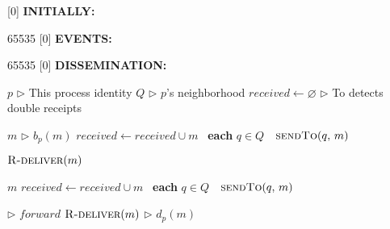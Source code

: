 
[0] {\textbf{INITIALLY:}}

{65535}{}
[0] {\textbf{EVENTS:}}

{65535}{}
[0] {\textbf{DISSEMINATION:}}


\newcommand{\comment}[1]{$\rhd$ #1}
\newcommand{\LINEIFTHEN}[2]{%
  \algorithmicif\ {#1}\ \algorithmicthen\ {#2} %
}
\newcommand{\LINEIFTHENELSE}[3]{%
  \algorithmicif\ {#1}\ \algorithmicthen\ {#2} \algorithmicelse\ {#3}%
}

\newcommand{\LINEFOR}[2]{%
  \algorithmicfor\ {#1}\ \algorithmicdo\ {#2} %
}

\begin{algorithmic}[1]
  \small

  \initially
  \State $p$ \hfill \comment{This process identity}
  \State $Q$ \hfill \comment{$p$'s neighborhood}
  \State $received \leftarrow \varnothing$ \hfill
  \comment{To detects double receipts} 
  \endInitially
  
  \dissemination

   {$m$} \hfill \comment{$b_p(m)$}
  \State $received \leftarrow received \cup m$
  \State \LINEFOR{\textbf{each} $q \in Q$} 
  {$\textsc{sendTo}(q,\, m)$}
  \State $\textsc{R-deliver}(m)$ 
  \EndFunction
  
  \Statex


  
   {$m$}  
  \State $received \leftarrow received \cup m$
  \State \LINEFOR{\textbf{each} $q \in Q$} {$\textsc{sendTo}(q,\, m)$}
  \hfill \comment{$forward$}
  \State $\textsc{R-deliver}(m)$ \hfill \comment{$d_p(m)$}
  \EndIf

  \EndFunction

\end{algorithmic}


